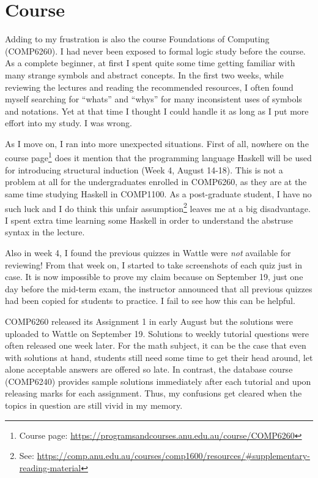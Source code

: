 \documentclass[12pt,a4paper]{article}
\begin{document}
\section{Course}
Adding to my frustration is also the course Foundations of Computing (COMP6260). I had never been exposed to formal logic study before the course.  As a complete beginner, at first I spent quite some time getting familiar with many strange symbols and abstract concepts.  In the first two weeks, while reviewing the lectures and reading the recommended resources, I often found myself searching for ``whats'' and ``whys'' for many inconsistent uses of symbols and notations.  Yet at that time I thought I could handle it as long as I put more effort into my study. I was wrong.

As I move on, I ran into more unexpected situations.  First of all, nowhere on the course page\footnote{Course page: \url{https://programsandcourses.anu.edu.au/course/COMP6260}} does it mention that the programming language Haskell will be used for introducing structural induction (Week 4, August 14-18).  This is not a problem at all for the undergraduates enrolled in COMP6260, as they are at the same time studying Haskell in COMP1100.  As a post-graduate student, I have no such luck and I do think this unfair assumption\footnote{See: \url{https://comp.anu.edu.au/courses/comp1600/resources/\#supplementary-reading-material}} leaves me at a big disadvantage.  I spent extra time learning some Haskell in order to understand the abstruse syntax in the lecture.

Also in week 4, I found the previous quizzes in Wattle were \emph{not} available for reviewing!  From that week on, I started to take screenshots of each quiz just in case.  It is now impossible to prove my claim because on September 19, just one day before the mid-term exam, the instructor announced that all previous quizzes had been copied for students to practice.  I fail to see how this can be helpful.

COMP6260 released its Assignment 1 in early August but the solutions were uploaded to Wattle on September 19.  Solutions to weekly tutorial questions were often released one week later.  For the math subject, it can be the case that even with solutions at hand, students still need some time to get their head around, let alone acceptable answers are offered so late.  In contrast, the database course (COMP6240) provides sample solutions immediately after each tutorial and upon releasing marks for each assignment.  Thus, my confusions get cleared when the topics in question are still vivid in my memory.
\end{document}
